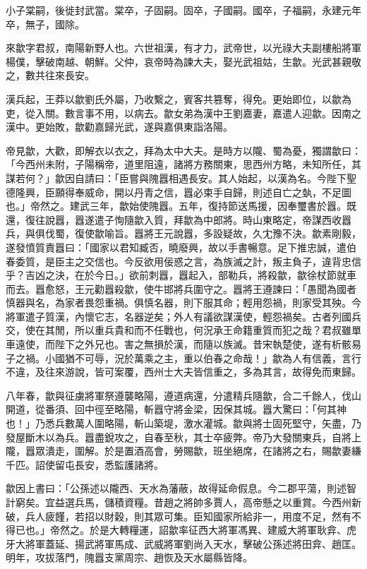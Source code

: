 \begin{pinyinscope}
小子棠嗣，後徙封武當。棠卒，子固嗣。固卒，子國嗣。國卒，子福嗣，永建元年卒，無子，國除。

來歙字君叔，南陽新野人也。六世祖漢，有才力，武帝世，以光祿大夫副樓船將軍楊僕，擊破南越、朝鮮。父仲，哀帝時為諫大夫，娶光武祖姑，生歙。光武甚親敬之，數共往來長安。

漢兵起，王莽以歙劉氏外屬，乃收繫之，賓客共篡奪，得免。更始即位，以歙為吏，從入關。數言事不用，以病去。歙女弟為漢中王劉嘉妻，嘉遣人迎歙。因南之漢中。更始敗，歙勸嘉歸光武，遂與嘉俱東詣洛陽。

帝見歙，大歡，即解衣以衣之，拜為太中大夫。是時方以隴、蜀為憂，獨謂歙曰：「今西州未附，子陽稱帝，道里阻遠，諸將方務關東，思西州方略，未知所任，其謀若何？」歙因自請曰：「臣嘗與隗囂相遇長安。其人始起，以漢為名。今陛下聖德隆興，臣願得奉威命，開以丹青之信，囂必束手自歸，則述自亡之埶，不足圖也。」帝然之。建武三年，歙始使隗囂。五年，復持節送馬援，因奉璽書於囂。既還，復往說囂，囂遂遣子恂隨歙入質，拜歙為中郎將。時山東略定，帝謀西收囂兵，與俱伐蜀，復使歙喻旨。囂將王元說囂，多設疑故，久冘豫不決。歙素剛毅，遂發憤質責囂曰：「國家以君知臧否，曉廢興，故以手書暢意。足下推忠誠，遣伯春委質，是臣主之交信也。今反欲用佞惑之言，為族滅之計，叛主負子，違背忠信乎？吉凶之決，在於今日。」欲前刺囂，囂起入，部勒兵，將殺歙，歙徐杖節就車而去。囂愈怒，王元勸囂殺歙，使牛邯將兵圍守之。囂將王遵諫曰：「愚聞為國者慎器與名，為家者畏怨重禍。俱慎名器，則下服其命；輕用怨禍，則家受其殃。今將軍遣子質漢，內懷它志，名器逆矣；外人有議欲謀漢使，輕怨禍矣。古者列國兵交，使在其閒，所以重兵貴和而不任戰也，何況承王命籍重質而犯之哉？君叔雖單車遠使，而陛下之外兄也。害之無損於漢，而隨以族滅。昔宋執楚使，遂有析骸易子之禍。小國猶不可辱，況於萬乘之主，重以伯春之命哉！」歙為人有信義，言行不違，及往來游說，皆可案覆，西州士大夫皆信重之，多為其言，故得免而東歸。

八年春，歙與征虜將軍祭遵襲略陽，遵道病還，分遣精兵隨歙，合二千餘人，伐山開道，從番須、回中徑至略陽，斬囂守將金梁，因保其城。囂大驚曰：「何其神也！」乃悉兵數萬人圍略陽，斬山築堤，激水灌城。歙與將士固死堅守，矢盡，乃發屋斷木以為兵。囂盡銳攻之，自春至秋，其士卒疲弊。帝乃大發關東兵，自將上隴，囂眾潰走，圍解。於是置酒高會，勞賜歙，班坐絕席，在諸將之右，賜歙妻縑千匹。詔使留屯長安，悉監護諸將。

歙因上書曰：「公孫述以隴西、天水為藩蔽，故得延命假息。今二郡平蕩，則述智計窮矣。宜益選兵馬，儲積資糧。昔趙之將帥多賈人，高帝懸之以重賞。今西州新破，兵人疲饉，若招以財穀，則其眾可集。臣知國家所給非一，用度不足，然有不得已也。」帝然之。於是大轉糧運，詔歙率征西大將軍馮異、建威大將軍耿弇、虎牙大將軍蓋延、揚武將軍馬成、武威將軍劉尚入天水，擊破公孫述將田弇、趙匡。明年，攻拔落門，隗囂支黨周宗、趙恢及天水屬縣皆降。


\end{pinyinscope}

